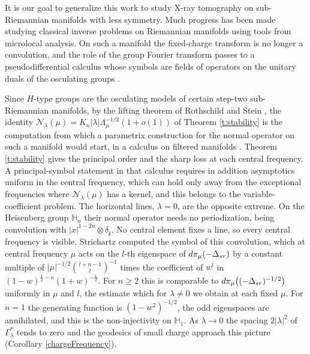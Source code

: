 \documentclass[11pt]{amsart}
\theoremstyle{plain}
\theoremstyle{definition}
\theoremstyle{remark}
\numberwithin{equation}{section}
\def\fz{\mathfrak{z}}
\def\cN{\mathcal{N}}
\def \heis {\mathbb{H}}
\numberwithin{equation}{section}
\begin{document}
It is our goal to generalize this work to study X-ray tomography on sub-Riemannian manifolds with less symmetry. Much progress has been made studying classical inverse problems on Riemannian manifolds using tools from microlocal analysis. On such a manifold the fixed-charge transform is no longer a convolution, and the role of the group Fourier transform passes to a pseudodifferential calculus whose symbols are fields of operators on the unitary duals of the osculating groups \cite{fermaniankammererQuantizationFilteredManifolds}. 

Since $H$-type groups are the osculating models of certain step-two sub-Riemannian manifolds, by the lifting theorem of Rothschild and Stein \cite{rothschildHypoellipticDifferentialOperators1976}, the identity $\cN_\lambda(\mu)=K_n|\lambda|\Lambda_\mu^{-1/2}(1+o(1))$ of Theorem \ref{t:stability} is the computation from which a parametrix construction for the normal operator on such a manifold would start, in a calculus on filtered manifolds \cite{kammererGeometricInvarianceSemiclassical2023, fermaniankammererQuantizationFilteredManifolds}. Theorem \ref{t:stability} gives the principal order and the sharp loss at each central frequency. A principal-symbol statement in that calculus requires in addition asymptotics uniform in the central frequency, which can hold only away from the exceptional frequencies where $\cN_\lambda(\mu)$ has a kernel, and this belongs to the variable-coefficient problem. The horizontal lines, $\lambda=0$, are the opposite extreme. On the Heisenberg group $\heis_n$ their normal operator needs no periodization, being convolution with $|x|^{1-2n}\otimes\delta_\fz$. No central element fixes a line, so every central frequency is visible. Strichartz \cite[Example 2]{strichartzLpHarmonicAnalysis1991} computed the symbol of this convolution, which at central frequency $\mu$ acts on the $l$-th eigenspace of $d\pi_\mu(-\Delta_{\rm{sr}})$ by a constant multiple of $|\mu|^{-1/2}\binom{l+n-1}{l}^{-1}$ times the coefficient of $w^l$ in $(1-w)^{\frac12-n}(1+w)^{-\frac12}$. For $n\geq2$ this is comparable to $d\pi_\mu\big((-\Delta_{\rm{sr}})^{-1/2}\big)$ uniformly in $\mu$ and $l$, the estimate which for $\lambda\neq0$ we obtain at each fixed $\mu$. For $n=1$ the generating function is $(1-w^2)^{-1/2}$, the odd eigenspaces are annihilated, and this is the non-injectivity on $\heis_1$. As $\lambda\to0$ the spacing $2|\lambda|^2$ of $\Gamma_\lambda^*$ tends to zero and the geodesics of small charge approach this picture (Corollary \ref{chargeFrequency}).
\end{document}

